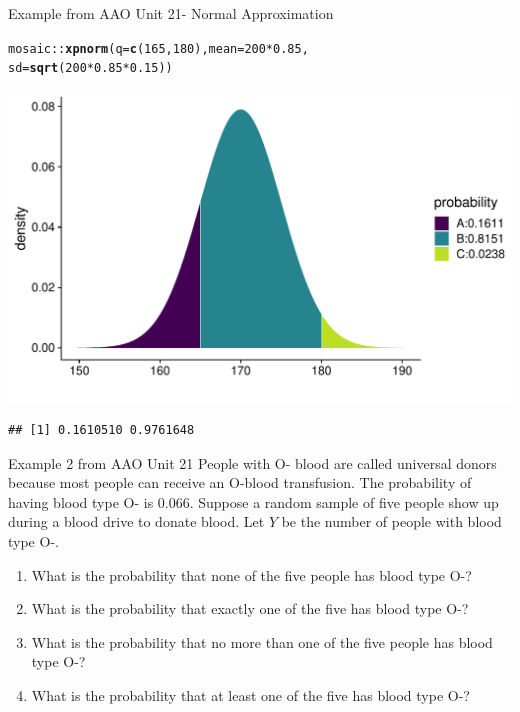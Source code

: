 \documentclass[10pt]{beamer}\usepackage[]{graphicx}\usepackage[]{color}
\makeatletter
\def\maxwidth{ %
  \ifdim\Gin@nat@width>\linewidth
    \linewidth
  \else
    \Gin@nat@width
  \fi
}
\newcommand{\hlnum}[1]{\textcolor[rgb]{0.686,0.059,0.569}{#1}}%
\newcommand{\hlopt}[1]{\textcolor[rgb]{0,0,0}{#1}}%
\newcommand{\hlstd}[1]{\textcolor[rgb]{0.345,0.345,0.345}{#1}}%
\newcommand{\hlkwc}[1]{\textcolor[rgb]{0.333,0.667,0.333}{#1}}%
\newcommand{\hlkwd}[1]{\textcolor[rgb]{0.737,0.353,0.396}{\textbf{#1}}}%
\newenvironment{kframe}{%
 \def\at@end@of@kframe{}%
 \ifinner\ifhmode%
  \def\at@end@of@kframe{\end{minipage}}%
  \begin{minipage}{\columnwidth}%
 \fi\fi%
 \def\FrameCommand##1{\hskip\@totalleftmargin \hskip-\fboxsep
 \colorbox{shadecolor}{##1}\hskip-\fboxsep
     \hskip-\linewidth \hskip-\@totalleftmargin \hskip\columnwidth}%
 \MakeFramed {\advance\hsize-\width
   \@totalleftmargin\z@ \linewidth\hsize
   \@setminipage}}%
 {\par\unskip\endMakeFramed%
 \at@end@of@kframe}
\newenvironment{knitrout}{}{} %
\makeatother
\begin{document}
\begin{frame}[fragile]{Example from AAO Unit 21- Normal Approximation}
	
\begin{knitrout}\tiny
{}\color{fgcolor}\begin{kframe}
\begin{alltt}
\hlstd{mosaic}\hlopt{::}\hlkwd{xpnorm}\hlstd{(}\hlkwc{q} \hlstd{=} \hlkwd{c}\hlstd{(}\hlnum{165}\hlstd{,}\hlnum{180}\hlstd{),} \hlkwc{mean} \hlstd{=} \hlnum{200} \hlopt{*} \hlnum{0.85}\hlstd{,}
\hlkwc{sd} \hlstd{=} \hlkwd{sqrt}\hlstd{(}\hlnum{200}\hlopt{*}\hlnum{0.85}\hlopt{*}\hlnum{0.15}\hlstd{))}
\end{alltt}
\end{kframe}

{\centering \includegraphics[width=\maxwidth]{figure/unnamed-chunk-9-1} 

}


\begin{kframe}\begin{verbatim}
## [1] 0.1610510 0.9761648
\end{verbatim}
\end{kframe}
\end{knitrout}
\end{frame}



\begin{frame}{Example 2 from AAO Unit 21}
	People with O- blood are called universal donors because most people can receive an O-blood transfusion. The probability of having blood type O- is 0.066. Suppose a random sample of five people show up during a blood drive to donate blood. Let $Y$ be the number of people with blood type O-.
	
	\begin{enumerate}
		\item What is the probability that none of the five people has blood type O-?
		\item What is the probability that exactly one of the five has blood type O-?
		\item What is the probability that no more than one of the five people has blood type O-?
		\item What is the probability that at least one of the five has blood type O-?
	\end{enumerate}
\end{frame}
\end{document}
